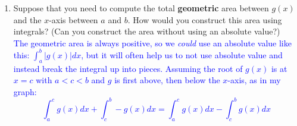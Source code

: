 \documentclass{ximera}
\begin{document}
\begin{exercise}
\begin{enumerate}
         \item Suppose that you need to compute the total {\bf{geometric}} area between $g(x)$ and the $x$-axis between $a$ and $b$. How would you construct this area using integrals? (Can you construct the area without using an absolute value?)\\
         \textcolor{blue}{The geometric area is always positive, so we \textit{could} use an absolute value like this: $\int_a^b |g(x)|dx$, but it will often help us to not use absolute value and instead break the integral up into pieces.  Assuming the root of $g(x)$ is at $x=c$ with $a<c<b$ and $g$ is first above, then below the $x$-axis, as in my graph:
         \[\int_a^c g(x)dx+\int_c^b -g(x)dx=\int_a^c g(x)dx-\int_c^b g(x)dx\]}
     \end{enumerate}

 \end{exercise}
\end{document}
